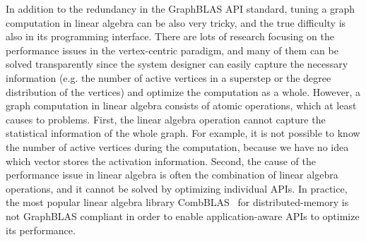 \documentclass{sokendai_thesis} %
\begin{document}
In addition to the redundancy in the GraphBLAS API standard, tuning a graph computation in linear algebra can be also very tricky, and the true difficulty is also in its programming interface.
There are lots of research focusing on the performance issues in the vertex-centric paradigm, and many of them can be solved transparently since the system designer can easily capture the necessary information (e.g. the number of active vertices in a superstep or the degree distribution of the vertices) and optimize the computation as a whole.
However, a graph computation in linear algebra consists of atomic operations, which at least causes to problems.
First, the linear algebra operation cannot capture the statistical information of the whole graph.
For example, it is not possible to know the number of active vertices during the computation, because we have no idea which vector stores the activation information.
Second, the cause of the performance issue in linear algebra is often the combination of linear algebra operations, and it cannot be solved by optimizing individual APIs.
In practice, the most popular linear algebra library CombBLAS~\cite{combblas} for distributed-memory is not GraphBLAS compliant in order to enable application-aware APIs to optimize its performance.

\end{document}
